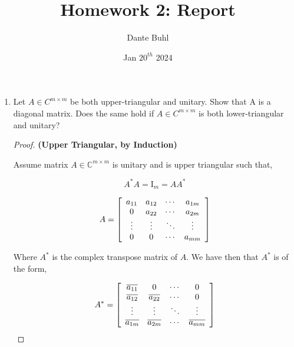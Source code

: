 \documentclass{article}
\title{Homework 2: Report}
\author{Dante Buhl}
\date{Jan $20^{th}$ 2024}
\begin{document}
\newcommand{\bs}[1]{\boldsymbol{#1}}
\newcommand{\bmp}[1]{\begin{minipage}{#1\textwidth}}
\newcommand{\emp}{\end{minipage}}
\newcommand{\R}{\mathbb{R}}
\newcommand{\C}{\mathbb{C}}
\newcommand{\N}{\mathcal{N}}
\newcommand{\I}{\mathrm{I}}
\newcommand{\K}{\bs{\mathrm{K}}}
\newcommand{\m}{\bs{\mu}_*}
\newcommand{\s}{\bs{\Sigma}_*}
\newcommand{\dt}{\Delta t}
\newcommand{\tr}[1]{\text{Tr}(#1)}
\newcommand{\Tr}[1]{\text{Tr}(#1)}

\maketitle


\begin{enumerate}

\item %
Let $A \in C^{m\times m}$ be both upper-triangular and unitary. Show that A is a
diagonal matrix. Does the same hold if $A \in C^{m\times m}$ is both lower-triangular
and unitary?

\begin{proof}

\textbf{ (Upper Triangular, by Induction)}

Assume matrix $A \in \C^{m \times m}$ is unitary and is upper triangular such that,

\[ 
    A^*A = \mathrm{I}_m = AA^*
\]

\[
    A = \left[\begin{array}{c c c c}
        a_{11} & a_{12} & \cdots & a_{1m} \\
        0 & a_{22} & \cdots & a_{2m} \\
        \vdots & \vdots & \ddots & \vdots \\
        0 & 0 & \cdots  & a_{mm}
        \end{array}\right]
\] 

Where $A^*$ is the complex transpose matrix of $A$. We have then that $A^*$ is of the form, 

\[
    A^* = \left[\begin{array}{c c c c}
        \overline{a_{11}} & 0 & \cdots & 0 \\
        \overline{a_{12}} & \overline{a_{22}} & \cdots & 0 \\
        \vdots & \vdots & \ddots & \vdots \\
        \overline{a_{1m}} & \overline{a_{2m}} & \cdots  & \overline{a_{mm}}
        \end{array}\right]
\] 


\end{proof}
\end{enumerate}
\end{document}
